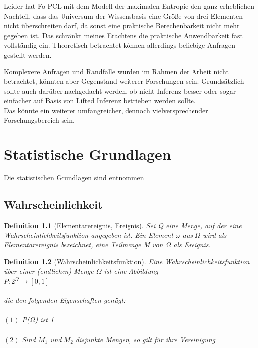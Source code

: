 \documentclass[draft]{scrreprt}
\newtheorem{Def}{Definition }[section]
\begin{document}
{Leider hat Fo-PCL mit dem Modell der maximalen Entropie den ganz erheblichen Nachteil, dass das Universum der Wissensbasis eine Größe von drei Elementen nicht überschreiten darf, da sonst eine praktische Berechenbarkeit nicht mehr gegeben ist. Das schränkt meines Erachtens die praktische Anwendbarkeit fast vollständig ein. Theoretisch betrachtet können allerdings beliebige Anfragen gestellt werden.

Komplexere Anfragen und Randfälle wurden im Rahmen der Arbeit nicht betrachtet, könnten aber Gegenstand weiterer Forschungen sein. Grundsätzlich sollte auch darüber nachgedacht werden, ob nicht Inferenz besser oder sogar einfacher auf Basis von Lifted Inferenz betrieben werden sollte.\\
Das könnte ein weiterer umfangreicher, dennoch vielversprechender Forschungsbereich sein. 




\appendix{}

\chapter{Statistische Grundlagen}
Die statistischen Grundlagen sind \cite{BKI08} entnommen
\section{Wahrscheinlichkeit} 


\begin{Def}[Elementarereignis, Ereignis] 
Sei Q eine Menge, auf der eine Wahrscheinlichkeitsfunktion angegeben ist. Ein Element $\omega$ aus $\Omega$ wird als Elementarereignis bezeichnet, eine Teilmenge M von $\Omega$ als Ereignis.\\
\end{Def}

\begin{Def}[Wahrscheinlichkeitsfunktion] 
Eine Wahrscheinlichkeitsfunktion über einer (endlichen) Menge $\Omega$ ist eine Abbildung\\

$P : 2^{\Omega} \rightarrow [0, 1] $\\
\\die den folgenden Eigenschaften genügt:\\
\\$ (1 )$ P($\Omega$) ist 1\\
\\$ (2) $ Sind $M_{1}$ und $M_{2}$ disjunkte Mengen, so gilt für ihre Vereinigung\\


\end{Def}}
\end{document}
